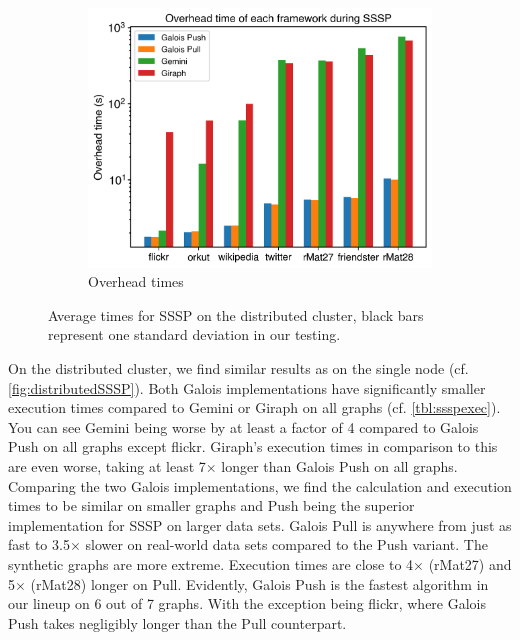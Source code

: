 \begin{figure}
\begin{subfigure}{0.32\textwidth}
		\includegraphics[width=\linewidth]{../../plots/distributedSSSP_overheadTime.png}
		\caption{Overhead times}
		\label{fig:distributedSSSP_overhead}
	\end{subfigure}
	\caption{Average times for SSSP on the distributed cluster, black bars represent one standard deviation in our testing.}
	\label{fig:distributedSSSP}
\end{figure}
On the distributed cluster, we find similar results as on the single node (cf. \autoref{fig:distributedSSSP}).
Both Galois implementations have significantly smaller execution times compared to Gemini or Giraph on all graphs (cf. \autoref{tbl:ssspexec}).
You can see Gemini being worse by at least a factor of 4 compared to Galois Push on all graphs except flickr.
Giraph's execution times in comparison to this are even worse, taking at least 7$\times$ longer than Galois Push on all graphs.
Comparing the two Galois implementations, we find the calculation and execution times to be similar on smaller graphs and Push being the superior implementation for SSSP on larger data sets. Galois Pull is anywhere from just as fast to 3.5$\times$ slower on real-world data sets compared to the Push variant. The synthetic graphs are more extreme. Execution times are close to 4$\times$ (rMat27) and 5$\times$ (rMat28) longer on Pull.
Evidently, Galois Push is the fastest algorithm in our lineup on 6 out of 7 graphs. With the exception being flickr, where Galois Push takes negligibly longer than the Pull counterpart.


